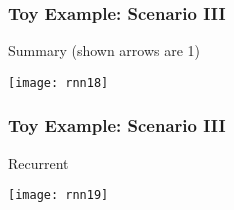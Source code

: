 \begin{frame}[fragile] \frametitle{Toy Example: Scenario III}
Summary (shown arrows are 1)
\begin{center}
\texttt{[image: rnn18]}
\end{center}
\end{frame}

\begin{frame}[fragile] \frametitle{Toy Example: Scenario III}
Recurrent
\begin{center}
\texttt{[image: rnn19]}
\end{center}
\end{frame}





